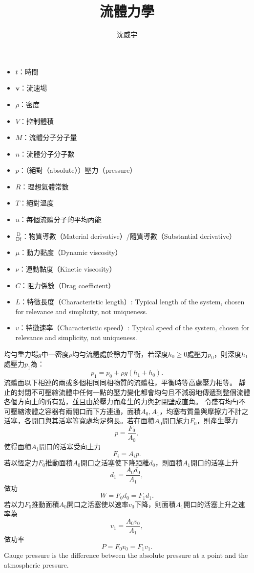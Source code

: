 \documentclass[a4paper,12pt]{article}
\begin{document}
\title{流體力學}
\author{沈威宇}
\date{\temtoday}
\titletocdoc
{}
\begin{itemize}
\item $t$：時間
\item $\mathbf{v}$：流速場
\item $\rho$：密度
\item $V$：控制體積
\item $M$：流體分子分子量
\item $n$：流體分子分子數
\item $p$：（絕對（absolute））壓力（pressure）
\item $R$：理想氣體常數
\item $T$：絕對溫度
\item $u$：每個流體分子的平均內能
\item $\frac{\mathrm{D}}{\mathrm{D}t}$：物質導數（Material derivative）/隨質導數（Substantial derivative）
\item $\mu$：動力黏度（Dynamic viscosity）
\item $\nu$：運動黏度（Kinetic viscosity）
\item $C$：阻力係數（Drag coefficient）
\item $L$：特徵長度（Characteristic length）: Typical length of the system, chosen for relevance and simplicity, not uniqueness.
\item $v$：特徵速率（Characteristic speed）: Typical speed of the system, chosen for relevance and simplicity, not uniqueness.
\end{itemize}
均勻重力場$g$中一密度$\rho$均勻流體處於靜力平衡，若深度$h_0\geq 0$處壓力$p_0$，則深度$h_1$處壓力$p_1$為：
\[p_1=p_0+\rho g(h_1+h_0).\]
流體面以下相連的兩或多個相同同相物質的流體柱，平衡時等高處壓力相等。
靜止的封閉不可壓縮流體中任何一點的壓力變化都會均勻且不減弱地傳遞到整個流體各個方向上的所有點，並且由於壓力而產生的力與封閉壁成直角。
令盛有均勻不可壓縮液體之容器有兩開口而下方連通，面積$A_0,A_1$，均塞有質量與摩擦力不計之活塞，各開口與其活塞等寬處均足夠長。若在面積$A_0$開口施力$F_0$，則產生壓力
\[p=\frac{F_0}{A_0},\]
使得面積$A_1$開口的活塞受向上力
\[F_i=A_ip.\]
若以恆定力$F_0$推動面積$A_0$開口之活塞使下降距離$d_0$，則面積$A_1$開口的活塞上升
\[d_1=\frac{A_0d_0}{A_1},\]
做功
\[W=F_0d_0=F_1d_1.\]
若以力$F_0$推動面積$A_0$開口之活塞使以速率$v_0$下降，則面積$A_1$開口的活塞上升之速率為
\[v_1=\frac{A_0v_0}{A_1},\]
做功率
\[P=F_0v_0=F_1v_1.\]
Gauge pressure is the difference between the absolute pressure at a point and the atmospheric pressure.
\end{document}
